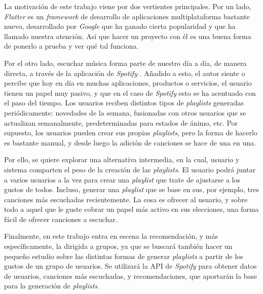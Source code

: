 La motivación de este trabajo viene por dos vertientes principales. Por un lado,
\textit{Flutter} \cite{flutter} es un \textit{framework} de desarrollo de aplicaciones multiplataforma
bastante nuevo, desarrollado por \textit{Google} que ha ganado cierta popularidad
 y que ha llamado nuestra atención. Así que hacer un proyecto con él es una buena 
 forma de ponerlo a prueba y ver qué tal funciona.

 Por el otro lado, escuchar música forma parte de nuestro día a día, de manera directa,
 a través de la aplicación de \textit{Spotify} \cite{spotify}. Añadido a esto, el autor siente o percibe
 que hoy en día en muchas aplicaciones, productos o servicios, el usuario tienen un papel
 muy pasivo, y que en el caso de \textit{Spotify} esto se ha acentuado con el paso del tiempo.
Los usuarios reciben distintos tipos de \textit{playlists} generadas periódicamente: novedades de la semana, 
fusionadas con otros usuarios que se actualizan semanalmente, predeterminadas para estados de ánimo, etc.
Por supuesto, los usuarios pueden crear sus propias \textit{playlists}, pero la forma de hacerlo es bastante manual, y desde luego
la adición de canciones se hace de una en una.

 Por ello, se quiere explorar una alternativa intermedia, en la cual, usuario y sistema comparten el peso de
 la creación de las \textit{playlists}. El usuario podrá juntar a varios usuarios a la vez para crear una
 \textit{playlist} que trate de ajustarse a los gustos de todos. Incluso, generar una \textit{playlist} 
 que se base en sus, por ejemplo, tres canciones más escuchadas recientemente. La cosa es ofrecer al 
 usuario, y sobre todo a aquel que le guste cobrar un papel más activo en sus elecciones, una forma fácil 
 de ofrecer canciones a escuchar.

 Finalmente, en este trabajo entra en escena la recomendación, y más específicamente, la dirigida a grupos,
 ya que se buscará también hacer un pequeño estudio sobre las distintas formas de generar \textit{playlists} a partir de los
 gustos de un grupo de usuarios. Se utilizará la API de \textit{Spotify} \cite{spotify_api} para obtener datos de usuarios, 
 canciones más escuchadas, y recomendaciones, que aportarán la base para la generación de \textit{playlists}.